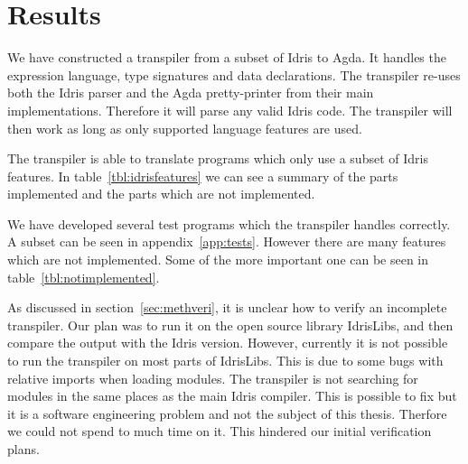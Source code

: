 \chapter{Results}



We have constructed a transpiler from a subset of Idris to Agda. It handles the
expression language, type signatures and data declarations.
The transpiler re-uses both the Idris parser and the Agda pretty-printer from
their main implementations. Therefore it will parse any valid Idris code. The
transpiler will then work as long as only supported language features are used.

The transpiler is able to translate programs which only use a subset of Idris
features. In table~\ref{tbl:idrisfeatures} we can see a summary of the parts
implemented and the parts which are not implemented.


We have developed several test programs which the transpiler handles correctly.
A subset can be seen in appendix~\ref{app:tests}. However there are many
features which are not implemented. Some of the more important one can be seen
in table~\ref{tbl:notimplemented}.

As discussed in section~\ref{sec:methveri}, it is unclear how to verify an
incomplete transpiler. Our plan was to run it on the open source library
IdrisLibs, and then compare the output with the Idris version.
However, currently it is not possible to run the transpiler on most parts of
IdrisLibs.  This is due to some bugs with relative imports when loading
modules. The transpiler is not searching for modules in the same places as the
main Idris compiler.
This is possible to fix but it is a software engineering
problem and not the subject of this thesis. Therfore we could not spend to much
time on it. This hindered our initial verification plans.


